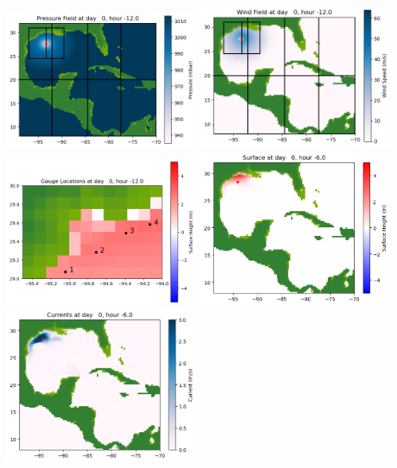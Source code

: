 \documentclass[11pt]{article}
\begin{document}
\includegraphics[width=0.475\textwidth]{frame0010fig1006.png}
\vskip 10pt 
\includegraphics[width=0.475\textwidth]{frame0010fig1007.png}
\includegraphics[width=0.475\textwidth]{frame0010fig1008.png}
\vskip 10pt 
\includegraphics[width=0.475\textwidth]{frame0011fig1001.png}
\includegraphics[width=0.475\textwidth]{frame0011fig1002.png}
\end{document}
